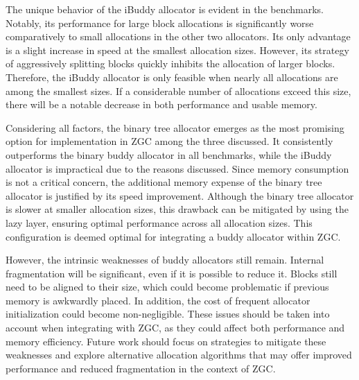 The unique behavior of the iBuddy allocator is evident in the benchmarks. Notably, its performance for large block allocations is significantly worse comparatively to small allocations in the other two allocators. Its only advantage is a slight increase in speed at the smallest allocation sizes. However, its strategy of aggressively splitting blocks quickly inhibits the allocation of larger blocks. Therefore, the iBuddy allocator is only feasible when nearly all allocations are among the smallest sizes. If a considerable number of allocations exceed this size, there will be a notable decrease in both performance and usable memory.

Considering all factors, the binary tree allocator emerges as the most promising option for implementation in ZGC among the three discussed. It consistently outperforms the binary buddy allocator in all benchmarks, while the iBuddy allocator is impractical due to the reasons discussed. Since memory consumption is not a critical concern, the additional memory expense of the binary tree allocator is justified by its speed improvement. Although the binary tree allocator is slower at smaller allocation sizes, this drawback can be mitigated by using the lazy layer, ensuring optimal performance across all allocation sizes. This configuration is deemed optimal for integrating a buddy allocator within ZGC.

However, the intrinsic weaknesses of buddy allocators still remain. Internal fragmentation will be significant, even if it is possible to reduce it. Blocks still need to be aligned to their size, which could become problematic if previous memory is awkwardly placed. In addition, the cost of frequent allocator initialization could become non-negligible. These issues should be taken into account when integrating with ZGC, as they could affect both performance and memory efficiency. Future work should focus on strategies to mitigate these weaknesses and explore alternative allocation algorithms that may offer improved performance and reduced fragmentation in the context of ZGC.

